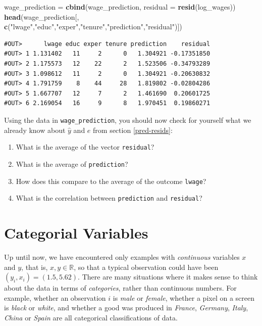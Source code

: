 \documentclass[]{book}
\newenvironment{Shaded}{\begin{snugshade}}{\end{snugshade}}
\newcommand{\KeywordTok}[1]{\textcolor[rgb]{0.13,0.29,0.53}{\textbf{#1}}}
\newcommand{\DataTypeTok}[1]{\textcolor[rgb]{0.13,0.29,0.53}{#1}}
\newcommand{\StringTok}[1]{\textcolor[rgb]{0.31,0.60,0.02}{#1}}
\newcommand{\NormalTok}[1]{#1}
\providecommand{\tightlist}{%
  \setlength{\itemsep}{0pt}\setlength{\parskip}{0pt}}
\begin{document}
\begin{Shaded}
\begin{Highlighting}[]
\NormalTok{wage_prediction =}\StringTok{ }\KeywordTok{cbind}\NormalTok{(wage_prediction, }\DataTypeTok{residual =} \KeywordTok{resid}\NormalTok{(log_wages))}
\KeywordTok{head}\NormalTok{(wage_prediction[, }\KeywordTok{c}\NormalTok{(}\StringTok{"lwage"}\NormalTok{,}\StringTok{"educ"}\NormalTok{,}\StringTok{"exper"}\NormalTok{,}\StringTok{"tenure"}\NormalTok{,}\StringTok{"prediction"}\NormalTok{,}\StringTok{"residual"}\NormalTok{)])}
\end{Highlighting}
\end{Shaded}

\begin{verbatim}
#OUT>      lwage educ exper tenure prediction    residual
#OUT> 1 1.131402   11     2      0   1.304921 -0.17351850
#OUT> 2 1.175573   12    22      2   1.523506 -0.34793289
#OUT> 3 1.098612   11     2      0   1.304921 -0.20630832
#OUT> 4 1.791759    8    44     28   1.819802 -0.02804286
#OUT> 5 1.667707   12     7      2   1.461690  0.20601725
#OUT> 6 2.169054   16     9      8   1.970451  0.19860271
\end{verbatim}

Using the data in \texttt{wage\_prediction}, you should now check for
yourself what we already know about \(\hat{y}\) and \(e\) from section
\ref{pred-resids}:

\begin{enumerate}
\def\labelenumi{\arabic{enumi}.}
\tightlist
\item
  What is the average of the vector \texttt{residual}?
\item
  What is the average of \texttt{prediction}?
\item
  How does this compare to the average of the outcome \texttt{lwage}?
\item
  What is the correlation between \texttt{prediction} and
  \texttt{residual}?
\end{enumerate}

\chapter{Categorial Variables}\label{categorical-vars}

Up until now, we have encountered only examples with \emph{continuous}
variables \(x\) and \(y\), that is, \(x,y \in \mathbb{R}\), so that a
typical observation could have been \((y_i,x_i) = (1.5,5.62)\). There
are many situations where it makes sense to think about the data in
terms of \emph{categories}, rather than continuous numbers. For example,
whether an observation \(i\) is \emph{male} or \emph{female}, whether a
pixel on a screen is \emph{black} or \emph{white}, and whether a good
was produced in \emph{France}, \emph{Germany}, \emph{Italy},
\emph{China} or \emph{Spain} are all categorical classifications of
data.
\end{document}
